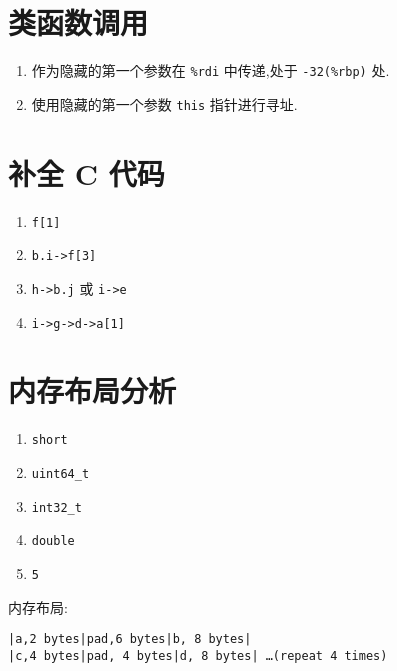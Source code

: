     \section{类函数调用}
    \begin{enumerate}
        \item 作为隐藏的第一个参数在 \texttt{\%rdi} 中传递,处于 \texttt{-32(\%rbp)} 处.
        \item 使用隐藏的第一个参数 \texttt{this} 指针进行寻址.
    \end{enumerate}
    \section{补全 C 代码}
    \begin{enumerate}
        \item \texttt{f[1]}
        \item \texttt{b.i->f[3]}
        \item \texttt{h->b.j} 或 \texttt{i->e}
        \item \texttt{i->g->d->a[1]}
    \end{enumerate}
    \section{内存布局分析}
    \begin{enumerate}
        \item \texttt{short}
        \item \texttt{uint64\_t}
        \item \texttt{int32\_t}
        \item \texttt{double}
        \item \texttt{5}
    \end{enumerate}
    内存布局:

    \texttt{|a,2 bytes|pad,6 bytes|b, 8 bytes|\\
        |c,4 bytes|pad, 4 bytes|d, 8 bytes|
        \ldots (repeat 4 times)}

